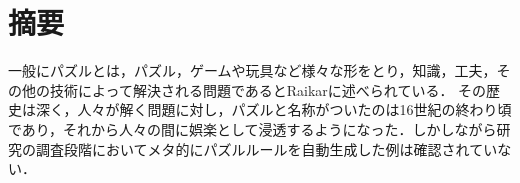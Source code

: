 \chapter*{摘要}
\label{chap:abstract}

一般にパズルとは，パズル，ゲームや玩具など様々な形をとり，知識，工夫，その他の技術によって解決される問題であるとRaikar\cite{Raikar2022}に述べられている．
その歴史は深く，人々が解く問題に対し，パズルと名称がついたのは16世紀の終わり頃であり，それから人々の間に娯楽として浸透するようになった．しかしながら研究の調査段階においてメタ的にパズルルールを自動生成した例は確認されていない．

